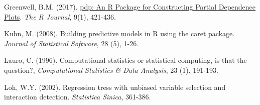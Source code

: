 \documentclass[]{book}
\theoremstyle{break}
\theoremstyle{definition}
\theoremstyle{definition}
\theoremstyle{definition}
\theoremstyle{remark}
\begin{document}
Greenwell, B.M. (2017).
\href{https://journal.r-project.org/archive/2017/RJ-2017-016/index.html}{pdp:
An R Package for Constructing Partial Dependence Plots}. \emph{The R
Journal}, 9(1), 421-436.

Kuhn, M. (2008). Building predictive models in R using the caret
package. \emph{Journal of Statistical Software}, 28 (5), 1-26.

Lauro, C. (1996). Computational statistics or statistical computing, is
that the question?, \emph{Computational Statistics \& Data Analysis}, 23
(1), 191-193.

Loh, W.Y. (2002). Regression tress with unbiased variable selection and
interaction detection. \emph{Statistica Sinica}, 361-386.


\end{document}
